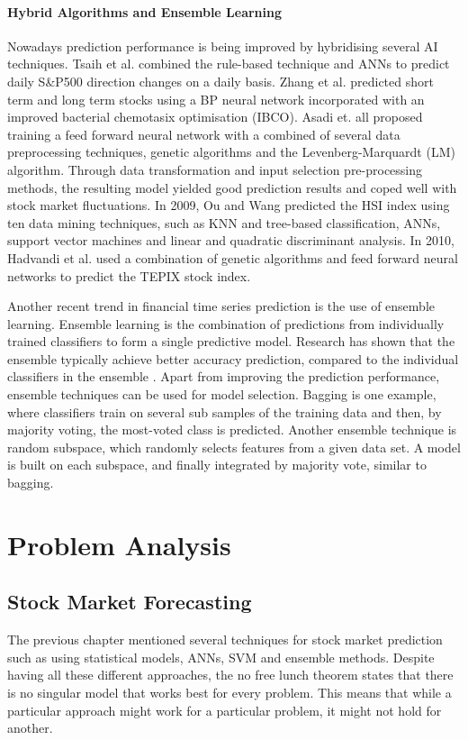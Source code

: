 \documentclass{UoYCSproject}
\begin{document}
\subsubsection{Hybrid Algorithms and Ensemble Learning}
Nowadays prediction performance is being improved by hybridising several AI techniques. Tsaih et al. \cite{tsaih1998forecasting} combined the rule-based technique and ANNs to predict daily S\&P500 direction changes on a daily basis. Zhang et al. \cite{zhang2009stock} predicted short term and long term stocks using a BP neural network incorporated with an improved bacterial chemotasix optimisation (IBCO). Asadi et. all \cite{asadi2012hybridization} proposed training a feed forward neural network with a combined of several data preprocessing techniques, genetic algorithms and the Levenberg-Marquardt (LM) algorithm. Through data transformation and input selection pre-processing methods, the resulting model yielded good prediction results and coped well with stock market fluctuations. In 2009, Ou and Wang \cite{ou2009prediction} predicted the HSI index using ten data mining techniques, such as KNN and tree-based classification, ANNs, support vector machines and linear and quadratic discriminant analysis. In 2010, Hadvandi et al. \cite{hadavandi2010developing} used a combination of genetic algorithms and feed forward neural networks to predict the TEPIX stock index.

Another recent trend in financial time series prediction is the use of ensemble learning. Ensemble learning is the combination of predictions from individually trained classifiers to form a single predictive model. Research has shown that the ensemble typically achieve better accuracy prediction, compared to the individual classifiers in the ensemble \cite{opitz1999popular}. Apart from improving the prediction performance, ensemble techniques can be used for model selection. Bagging \cite{breiman1996bagging} is one example, where classifiers train on several sub samples of the training data and then, by majority voting, the most-voted class is predicted. Another ensemble technique is random subspace, which randomly selects features from a given data set. A model is built on each subspace, and finally integrated by majority vote, similar to bagging. 

\chapter{Problem Analysis}
\label{cha:problemanalysis}
\section{Stock Market Forecasting}
The previous chapter mentioned several techniques for stock market prediction such as using statistical models, ANNs, SVM and ensemble methods. Despite having all these different approaches, the no free lunch theorem \cite{wolpert1997no} states that there is no singular model that works best for every problem. This means that while a particular approach might work for a particular problem, it might not hold for another. 
\end{document}
